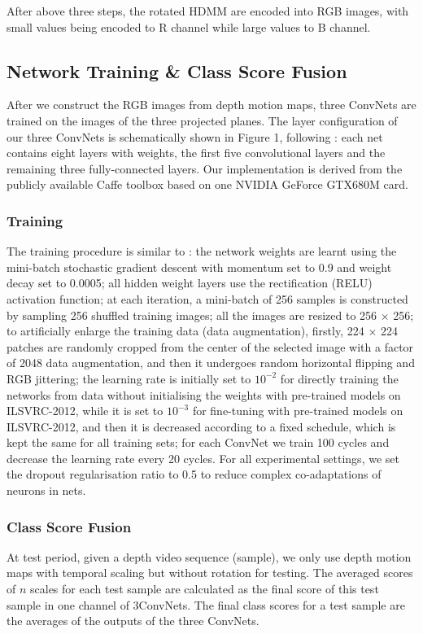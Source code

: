 \documentclass[conference]{IEEEtran}
\begin{document}
After above three steps, the rotated HDMM are encoded into RGB images, with small values being encoded to R channel while large values to B channel.

\subsection{Network Training \& Class Score Fusion}
After we construct the RGB images from depth motion maps, three ConvNets are trained on the images of the three projected planes. The layer configuration of our three ConvNets is schematically shown in Figure 1, following \cite{krizhevsky2012imagenet}: each net contains eight layers with weights, the first five convolutional layers and the remaining three fully-connected layers. Our implementation is derived from the publicly available Caffe toolbox \cite{jia2014caffe} based on one NVIDIA GeForce GTX680M card.
\subsubsection*{Training}
The training procedure is similar to \cite{krizhevsky2012imagenet}: the network weights are learnt using the mini-batch stochastic gradient descent with momentum set to 0.9 and weight decay set to 0.0005; all hidden weight layers use the rectification (RELU) activation function; at each iteration, a mini-batch of 256 samples is constructed by sampling 256 shuffled training images; all the images are resized to 256 $\times$ 256; to artificially enlarge the training data (data augmentation), firstly, 224 $\times$ 224 patches are randomly cropped from the center of the selected image with a factor of 2048 data augmentation, and then it undergoes random horizontal flipping and RGB jittering; the learning rate is initially set to $10^{-2}$ for directly training the networks from data without initialising the weights with pre-trained models on ILSVRC-2012, while it is set to $10^{-3}$ for fine-tuning with pre-trained models on ILSVRC-2012, and then it is decreased according to a fixed schedule, which is kept the same for all training sets; for each ConvNet we train 100 cycles and decrease the learning rate every 20 cycles. For all experimental settings, we set the dropout regularisation ratio to 0.5 to reduce complex co-adaptations of neurons in nets.

\subsubsection*{Class Score Fusion}
At test period, given a depth video sequence (sample), we only use depth motion maps with temporal scaling but without rotation for testing. The averaged scores of $n$ scales for each test sample are calculated as the final score of this test sample in one channel of 3ConvNets.
The final class scores for a test sample are the averages of the outputs of the three ConvNets. 
\end{document}
